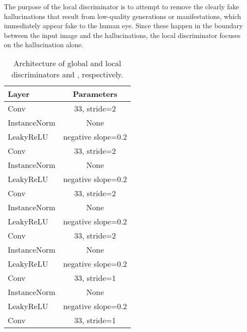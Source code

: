 \documentclass{article}
\begin{document}
The purpose of the local discriminator is to attempt to remove the clearly fake hallucinations that result from low-quality generations or manifestations, which immediately appear fake to the human eye. Since these happen in the boundary between the input image and the hallucinations, the local discriminator focuses on the hallucination alone.

\begin{table}[h] 
  \centering  
    \begin{tabular}{lc}  
    \hline
    \textbf{Layer} & \textbf{Parameters}\\ 
    \hline \hline
      Conv & 33, stride=2 \\
    \hline
      InstanceNorm & None \\
    \hline
      LeakyReLU & negative slope=0.2 \\
    \hline
      Conv & 33, stride=2 \\
    \hline
      InstanceNorm & None \\
    \hline
      LeakyReLU & negative slope=0.2 \\
    \hline
      Conv & 33, stride=2 \\
    \hline
      InstanceNorm & None \\
    \hline
      LeakyReLU & negative slope=0.2 \\
    \hline
      Conv & 33, stride=2 \\
    \hline
      InstanceNorm & None \\
    \hline
      LeakyReLU & negative slope=0.2 \\
    \hline
      Conv & 33, stride=1 \\
    \hline
      InstanceNorm & None \\
    \hline
      LeakyReLU & negative slope=0.2 \\
    \hline
      Conv & 33, stride=1 \\
    \hline
    \end{tabular}
  
  \caption{Architecture of global and local discriminators  and , respectively.} 
  \label{tab:3}
\end{table}
\end{document}
